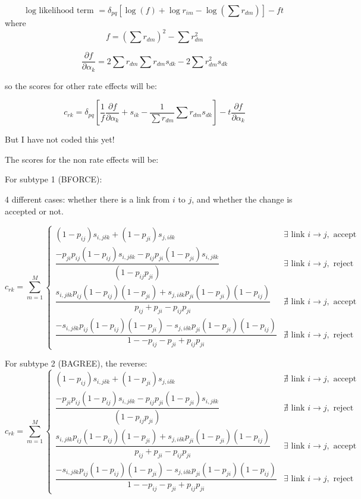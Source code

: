 \documentclass[12pt,a4paper]{article}
\renewcommand{\=}{\,=\,}
\newcommand{\+}{\,+\,}
\begin{document}
$$
    \text{log likelihood term } = \delta_{pq} \left [\log(f) + \log r_{im}
    - \log(\sum r_{dm})\right ] -ft
$$
where
$$f=(\sum r_{dm})^2 - \sum r_{dm}^2$$

$$\frac{\partial f}{\partial \alpha_k} =
2 \sum r_{dm} \sum r_{dm} s_{dk} - 2 \sum r_{dm}^2 s_{dk}
$$

so the scores for other rate effects will be:

$$
c_{rk} = \delta_{pq}\left [ \dfrac{1}{f} \frac{\partial f}{\partial \alpha_k}  + s_{ik}
- \dfrac{1}{\sum r_{dm}}\sum
r_{dm} s_{dk} \right ]-
t\frac{\partial f}{\partial \alpha_k}
$$

But I have not coded this yet!

The scores for the non rate effects will be:

For subtype 1 (BFORCE):

4 different cases: whether there is a link from $i$ to $j$, and whether the
change is accepted or not.

$$
c_{rk}= \sum_{m=1}^M \begin{cases}
 (1-p_{ij})s_{i,j\delta k} + (1-p_{ji}) s_{j,i\delta k}
& \exists \text{ link }  i \rightarrow j, \text{ accept}\\
\dfrac{
 -p_{ji} p_{ij} (1-p_{ij}) s_{i, j\delta k} - p_{ij} p_{ji} (1-p_{ji})
s_{i, j\delta k}}{(1 - p_{ij} p_{ji})} & \exists \text{ link }
i \rightarrow j, \text{ reject}\\
\dfrac{s_{i, j\delta k} p_{ij} (1 - p_{ij}) (1-p_{ji}) +
 s_{j, i\delta k} p_{ji} (1 - p_{ji}) (1-p_{ij}) }
{p_{ij} + p_{ji} - p_{ij}p_{ji}}& \nexists \text{ link } i \rightarrow j,
\text{ accept}\\
\dfrac{-s_{i, j\delta k} p_{ij}(1-p_{ij})(1-p_{ji}) -
s_{j, i\delta k} p_{ji}(1-p_{ji})(1-p_{ij})}
{1 -- p_{ij} - p_{ji} + p_{ij}p_{ji}} &\nexists \text{ link } i \rightarrow j,
\text{ reject}
\end{cases}
$$

For subtype 2 (BAGREE), the reverse:
$$c_{rk}= \sum_{m=1}^M \begin{cases}
 (1-p_{ij})s_{i,j\delta k} + (1-p_{ji}) s_{j,i\delta k}
& \nexists \text{ link }  i \rightarrow j, \text{ accept}\\
\dfrac{
 -p_{ji} p_{ij} (1-p_{ij}) s_{i, j\delta k} - p_{ij} p_{ji} (1-p_{ji})
s_{i, j\delta k}}{(1 - p_{ij} p_{ji})} & \nexists \text{ link }
i \rightarrow j, \text{ reject}\\
\dfrac{s_{i, j\delta k} p_{ij} (1 - p_{ij}) (1-p_{ji}) +
 s_{j, i\delta k} p_{ji} (1 - p_{ji}) (1-p_{ij}) }
{p_{ij} + p_{ji} - p_{ij}p_{ji}}& \exists \text{ link } i \rightarrow j,
\text{ accept}\\
\dfrac{-s_{i, j\delta k} p_{ij}(1-p_{ij})(1-p_{ji}) -
s_{j, i\delta k} p_{ji}(1-p_{ji})(1-p_{ij})}
{1 -- p_{ij} - p_{ji} + p_{ij}p_{ji}} &\exists \text{ link } i \rightarrow j,
\text{ reject}
\end{cases}
$$
\end{document}
